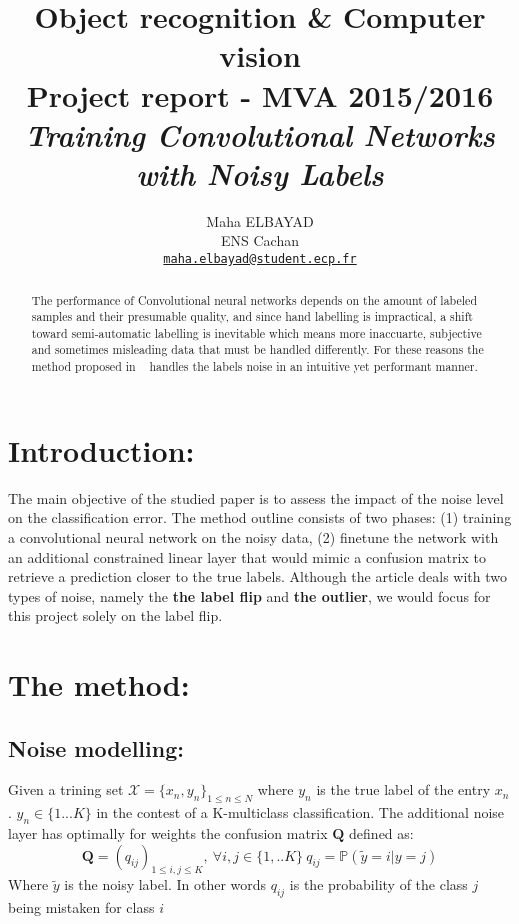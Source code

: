 \documentclass[10pt,twocolumn,letterpaper]{article}
\newcommand{\p}{\mathbb{P}}
\newcommand{\X}{\mathcal{X}}
\newcommand{\Q}{\mathbf{Q}}
\begin{document}
\title{Object recognition \& Computer vision\\
Project report - MVA 2015/2016\\
\textit{Training Convolutional Networks with Noisy Labels}}

\author{Maha ELBAYAD\\
ENS Cachan\\
\href{mailto:maha.elbayad@student.ecp.fr}{\tt maha.elbayad@student.ecp.fr}}
\maketitle

\begin{abstract}
The performance of Convolutional neural networks depends on the amount of labeled samples and their presumable quality, and since hand labelling is impractical, a shift toward semi-automatic labelling is inevitable which means more inaccuarte, subjective and sometimes misleading data that must be handled differently. For these reasons the method proposed in ~\cite{FB} handles the labels noise in an intuitive yet performant manner. 
\end{abstract}

\section{Introduction:}
The main objective of the studied paper is to assess the impact of the noise level on the classification error. The method outline consists of two phases: (1) training a convolutional neural network on the noisy data, (2) finetune the network with an additional constrained linear layer that would mimic a confusion matrix to retrieve a prediction closer to the true labels. Although the article deals with two types of noise, namely the \textbf{the label flip} and \textbf{the outlier}, we would focus for this project solely on the label flip. 

\section{The method:}
\subsection{Noise modelling:}
Given a trining set $\X=\{x_n,y_n\}_{1\leq n\leq N}$ where $y_n$ is the true label of the entry $x_n$. $y_n\in\{1...K\}$ in the contest of a K-multiclass classification. The additional noise layer has optimally for weights the confusion matrix $\Q$ defined as:
\[\Q=(q_{ij})_{1\leq i,j\leq K},\:\forall i,j\in\{1,..K\}\:q_{ij}=\p(\tilde y=i|y=j)\]
Where $\tilde y$ is the noisy label. In other words $q_{ij}$ is the probability of the class $j$ being mistaken for class $i$
\end{document}
